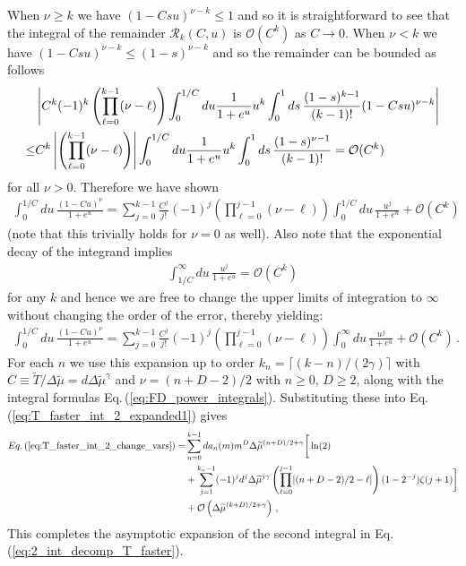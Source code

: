 \documentclass[sn-mathphys,Numbered]{sn-jnl}
\newcommand{\req}[1]{Eq.\,(\ref{#1})}
\begin{document}
When $\nu\geq k$ we have $(1-Csu)^{\nu-k}\leq 1$ and so it is straightforward to see that the integral of the remainder $\mathcal{R}_k(C,u)$ is $\mathcal{O}(C^k)$ as $C\to 0$. When $\nu<k$ we have $(1-Csu)^{\nu-k}\leq (1-s)^{\nu-k}$ and so the remainder can be bounded as follows
\begin{align}
&\left|C^k (-1)^k\left(\prod_{\ell=0}^{k-1}(\nu-\ell)\right)\int_0^{1/C} du \frac{1}{1+e^u} u^k\int_0^1ds\,\frac{(1-s)^{k-1}}{(k-1)!} (1-Csu)^{\nu-k}\right|\notag\\
\leq&C^k\left| \left(\prod_{\ell=0}^{k-1}(\nu-\ell)\right)\right|\int_0^{1/C} du \frac{1}{1+e^u} u^k\int_0^1ds\,\frac{(1-s)^{\nu-1}}{(k-1)!} =\mathcal{O}(C^k)
\end{align}
for all $\nu>0$. Therefore we have shown
\begin{align}
\int_0^{1/C} du \,\frac{(1-Cu)^\nu}{1+e^u}
=\sum_{j=0}^{k-1}\frac{C^j}{j!}(-1)^j\left(\prod_{\ell=0}^{j-1}(\nu-\ell) \right)\int_0^{1/C} du \,\frac{u^j}{1+e^u} +\mathcal{O}(C^k)
\end{align}
(note that this trivially holds for $\nu=0$ as well). Also note that the exponential decay of the integrand implies 
\begin{align}
\int_{1/C}^\infty du\, \frac{u^j}{1+e^u}=\mathcal{O}(C^k)
\end{align} for any $k$ and hence we are free to change the upper limits of integration to $\infty$ without changing the order of the error, thereby yielding:
\begin{align}
\int_0^{1/C} du \,\frac{(1-Cu)^\nu}{1+e^u}
=\sum_{j=0}^{k-1}\frac{C^j}{j!}(-1)^j\left(\prod_{\ell=0}^{j-1}(\nu-\ell) \right)\int_0^{\infty} du \,\frac{u^j}{1+e^u} +\mathcal{O}(C^k)\,.
\end{align}
For each $n$ we use this expansion up to order $k_n= \lceil(k-n)/(2\gamma)\rceil$ with $C\equiv \widetilde{T}/\Delta\widetilde{\mu}=d\Delta\widetilde{\mu}^{\gamma}$ and $\nu=(n+D-2)/2$ with $n\geq 0$, $D\geq 2$, along with the integral formulas 
\req{eq:FD_power_integrals}. Substituting these into \req{eq:T_faster_int_2_expanded1} gives
\begin{align} \label{eq:T_faster_int_2_expanded2}
 \req{eq:T_faster_int_2_change_vars} =&\sum_{n=0}^{k-1} da_n(m)m^{D}\Delta\widetilde{\mu}^{(n+D)/2+\gamma}\bigg[\ln(2)\\
 &+\sum_{j=1}^{k_n-1}(-1)^jd^j\Delta\widetilde{\mu}^{j\gamma}\left(\prod_{\ell=0}^{j-1}[(n+D-2)/2-\ell] \right)(1-2^{-j})\zeta(j+1) \bigg] \notag\\
 &+\mathcal{O}\left(\Delta\widetilde{\mu}^{(k+D)/2+\gamma}\right)\notag\,,
\end{align}
This completes the asymptotic expansion of the second integral in \req{eq:2_int_decomp_T_faster}.
\end{document}
